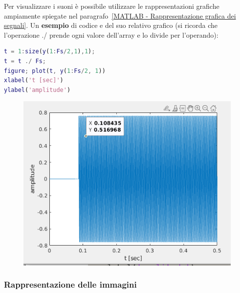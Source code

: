 \documentclass[a4paper]{article}
\begin{document}
	\noindent
	Per visualizzare i suoni è possibile utilizzare le rappresentazioni grafiche ampiamente spiegate nel paragrafo~\ref{MATLAB - Rappresentazione grafica dei segnali}. Un \textcolor{Green4}{\textbf{esempio}} di codice e del suo relativo grafico (si ricorda che l'operazione \textsf{./} prende ogni valore dell'array e lo divide per l'operando):
	\begin{lstlisting}[language=MATLAB]
t = 1:size(y(1:Fs/2,1),1);
t = t ./ Fs;
figure; plot(t, y(1:Fs/2, 1))
xlabel('t [sec]')
ylabel('amplitude')\end{lstlisting}
	\begin{figure}[!htp]
		\centering
		\includegraphics[width=.7\textwidth]{img/lab/visualizzazione-segnali_3.png}
	\end{figure}\newpage

	\subsubsection{Rappresentazione delle immagini}
	
\end{document}
